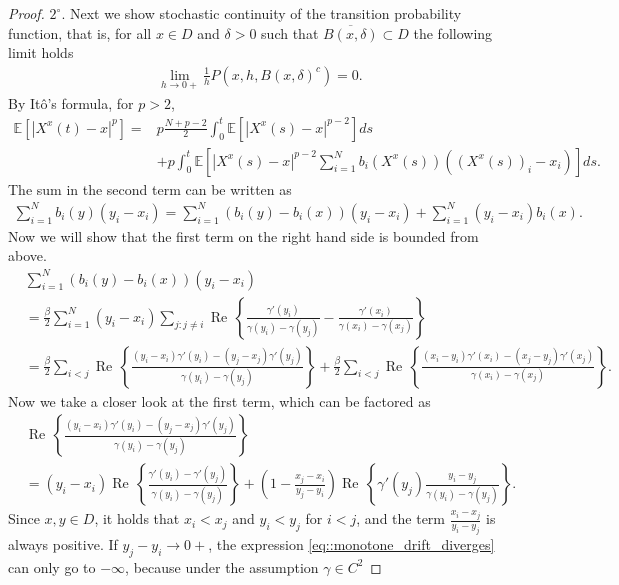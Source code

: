 \documentclass[10pt,a4paper]{amsart}
\renewcommand{\Re}{\operatorname{Re}\,}
\begin{document}
\begin{proof}
$2^{\circ}.$ Next we show stochastic continuity of the transition probability function, that is, for all $x\in D$ and $\delta > 0$ such that $\overline{B(x,\delta)}\subset D$ the following limit holds
\begin{align*}
    \lim\limits_{h\to 0+}\frac{1}{h}P(x,h,B(x,\delta)^{c})=0.
\end{align*}
By Itô's formula, for $p>2$,
\begin{align*}
    \mathbb{E}\left[|X^{x}(t)-x|^{p}\right] 
    = &p\frac{N+p-2}{2}\int_{0}^{t}\mathbb{E}\left[|X^{x}(s)-x|^{p-2}\right]ds \\
    &+ p \int_{0}^{t}\mathbb{E}\left[|X^{x}(s)-x|^{p-2}\sum\limits_{i=1}^{N}b_{i}(X^{x}(s))((X^{x}(s))_{i}-x_{i})\right]ds.
\end{align*}
The sum in the second term can be written as
\begin{align*}
    \sum\limits_{i=1}^{N}b_{i}(y)(y_{i}-x_{i}) 
    = \sum\limits_{i=1}^{N}(b_{i}(y)-b_{i}(x))(y_{i}-x_{i})  +\sum\limits_{i=1}^{N} (y_{i}-x_{i})b_{i}(x). 
\end{align*}
Now we will show that the first term on the right hand side is bounded from above.
\begin{align*}
     &\sum\limits_{i=1}^{N}(b_{i}(y)-b_{i}(x))(y_{i}-x_{i}) \\
     &= \frac{\beta}{2}\sum\limits_{i=1}^{N}(y_{i}-x_{i})\sum\limits_{j:j\neq i}\Re\left\{\frac{\gamma'(y_{i})}{\gamma(y_{i})-\gamma(y_{j})}-\frac{\gamma'(x_{i})}{\gamma(x_{i})-\gamma(x_{j})} \right\}\\
     &= \frac{\beta}{2}\sum_{i < j}\Re\left\{\frac{(y_{i}-x_{i})\gamma'(y_{i})-(y_{j}-x_{j})\gamma'(y_{j})}{\gamma(y_{i})-\gamma(y_{j})}\right\}
    + \frac{\beta}{2} \sum_{i< j}\Re\left\{\frac{(x_{i}-y_{i})\gamma'(x_{i})-(x_{j}-y_{j})\gamma'(x_{j})}{\gamma(x_{i})-\gamma(x_{j})}\right\}.
\end{align*}
Now we take a closer look at the first term, which can be factored as
\begin{align}
    &\Re\left\{\frac{(y_{i}-x_{i})\gamma'(y_{i})-(y_{j}-x_{j})\gamma'(y_{j})}{\gamma(y_{i})-\gamma(y_{j})}\right\} \\
    &= (y_{i}-x_{i})\Re\left\{\frac{\gamma'(y_{i})-\gamma'(y_{j})}{\gamma(y_{i})-\gamma(y_{j})}\right\}
    + \left(1 - \frac{x_{j}-x_{i}}{y_{j}-y_{i}}\right)\Re\left\{\gamma'(y_{j})\frac{y_{i}-y_{j}}{\gamma(y_{i})-\gamma(y_{j})}\right\}.\label{eq::monotone_drift_diverges}
\end{align}
Since $x,y\in D$, it holds that $x_{i}<x_{j}$ and $y_{i}<y_{j}$ for $i<j$, and the term $\frac{x_{i}-x_{j}}{y_{i}-y_{j}}$ is always positive.  If $y_{j}-y_{i}\to0+$, the expression \eqref{eq::monotone_drift_diverges} can only go to $-\infty$, because under the assumption $\gamma\in C^2$

\end{proof}
\end{document}
